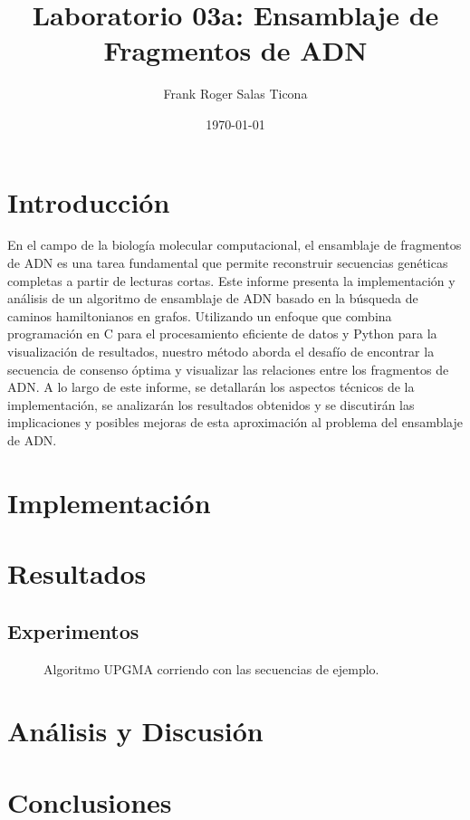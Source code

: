 \documentclass{article}
\title{Laboratorio 03a: Ensamblaje de Fragmentos de ADN}
\author{Frank Roger Salas Ticona}
\date{\today}
\begin{document}
\maketitle

\section{Introducción}
En el campo de la biología molecular computacional, el ensamblaje de fragmentos de ADN es una tarea fundamental que permite reconstruir secuencias genéticas completas a partir de lecturas cortas. Este informe presenta la implementación y análisis de un algoritmo de ensamblaje de ADN basado en la búsqueda de caminos hamiltonianos en grafos. Utilizando un enfoque que combina programación en C para el procesamiento eficiente de datos y Python para la visualización de resultados, nuestro método aborda el desafío de encontrar la secuencia de consenso óptima y visualizar las relaciones entre los fragmentos de ADN. A lo largo de este informe, se detallarán los aspectos técnicos de la implementación, se analizarán los resultados obtenidos y se discutirán las implicaciones y posibles mejoras de esta aproximación al problema del ensamblaje de ADN.
\section{Implementación}
\section{Resultados}
\subsection{Experimentos}
\begin{figure}[!htbp]
    \centering
    \caption{Algoritmo UPGMA corriendo con las secuencias de ejemplo.}
    \label{fig:code1}
\end{figure}
\section{Análisis y Discusión}
\section{Conclusiones}
\end{document}
